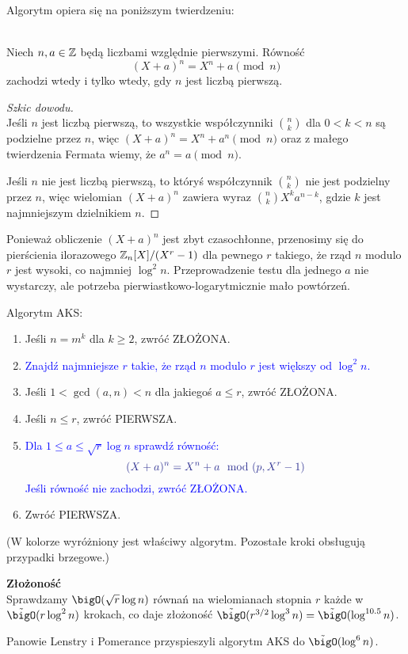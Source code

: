 Algorytm opiera się na poniższym twierdzeniu:

\begin{theorem} \\
Niech \( n, a \in \mathbb{Z} \) będą liczbami względnie pierwszymi. Równość
\[
    (X + a)^n = X^n + a \pmod{n}
\]
zachodzi wtedy i tylko wtedy, gdy \( n \) jest liczbą pierwszą.
\end{theorem}
\begin{proof}[Szkic dowodu]\\
Jeśli \( n \) jest liczbą pierwszą, to wszystkie współczynniki \( n \choose k \) dla \( 0 < k < n \) są podzielne przez \( n \), więc \( (X + a)^n = X^n + a^n \pmod{n} \) oraz z małego twierdzenia Fermata wiemy, że \( a^n = a \pmod{n} \).

Jeśli \( n \) nie jest liczbą pierwszą, to któryś współczynnik \( n \choose k \) nie jest podzielny przez \( n \), więc wielomian \( (X + a)^n \) zawiera wyraz \( {n \choose k} X^ka^{n-k} \), gdzie \( k \) jest najmniejszym dzielnikiem \( n \).
\end{proof}

Ponieważ obliczenie \( (X + a)^n \) jest zbyt czasochłonne, przenosimy się do pierścienia ilorazowego \( \mathbb{Z}_n[X]/(X^r - 1) \) dla pewnego \( r \) takiego, że rząd \( n \)
modulo \( r \) jest wysoki, co najmniej \( \log^2n \). Przeprowadzenie testu dla jednego \( a \) nie wystarczy, ale potrzeba pierwiastkowo-logarytmicznie mało powtórzeń.

\newpage
\begin{greyframe}
    Algorytm AKS:
    \begin{enumerate}
        \item Jeśli \( n = m^k \) dla \( k \geq 2 \), zwróć ZŁOŻONA.
        \item \textcolor{Blue}{Znajdź najmniejsze \( r \) takie, że rząd \( n \) modulo \( r \) jest większy od \( \log^2n \).}
        \item Jeśli \( 1 < \gcd(a, n) < n \) dla jakiegoś \( a \leq r \), zwróć ZŁOŻONA.
        \item Jeśli \( n \leq r \), zwróć PIERWSZA.
        \item \textcolor{Blue}{Dla \( 1 \leq a \leq \sqrt{r}\log n \) sprawdź równość:}
        \[
            \textcolor{Blue}{(X + a)^n = X^n + a \mod (p, X^r-1)}
        \]
        \textcolor{Blue}{Jeśli równość nie zachodzi, zwróć ZŁOŻONA.}
        \item Zwróć PIERWSZA.
    \end{enumerate}
\end{greyframe}
{\small (W kolorze wyróżniony jest właściwy algorytm. Pozostałe kroki obsługują przypadki brzegowe.)}

\textbf{Złożoność} \\
Sprawdzamy \( \bigO(\sqrt{r} \log n) \) równań na wielomianach stopnia \( r \) każde w \( \Tilde{\bigO}(r \log^2n) \) krokach, co daje złożoność \( \Tilde{\bigO}(r^{3/2} \log^3n) = \Tilde{\bigO}(\log^{10.5}n)\).

Panowie Lenstry i Pomerance przyspieszyli algorytm AKS do \( \Tilde{\bigO}(\log^6n) \).
